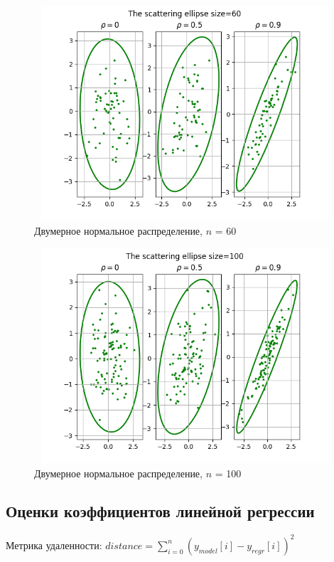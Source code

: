 \documentclass[a4paper]{article}
\begin{document}
	\begin{figure}[H]
		\centering
		\includegraphics[width = 13cm, height = 8cm]{./lab2_1/pictures/the scattering ellipse size=60.png}
		\caption{Двумерное нормальное распределение, $n$ = 60}
		\label{fig:n60}
	\end{figure}

	\begin{figure}[H]
		\centering
		\includegraphics[width = 13cm, height = 8cm]{./lab2_1/pictures/the scattering ellipse size=100.png}
		\caption{Двумерное нормальное распределение, $n$ = 100}
		\label{fig:n100}
	\end{figure}
\subsection{Оценки коэффициентов линейной регрессии}
	
	\noindent Метрика удаленности: $distance = \sum_{i=0}^{n}(y_{model}[i]-y_{regr}[i])^2$
\end{document}
